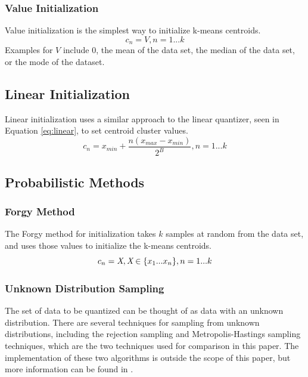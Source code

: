 \documentclass[journal]{IEEEtran}
\begin{document}
\subsubsection{Value Initialization}
Value initialization is the simplest way to initialize k-means centroids.
\begin{equation}
    c_n = V, n = 1...k
\end{equation}
Examples for $V$ include $0$, the mean of the data set, the median of the data set, or the mode of the dataset.

\subsection{Linear Initialization}
Linear initialization uses a similar approach to the linear quantizer, seen in Equation \ref{eq:linear}, to set centroid cluster values.
\begin{equation}
    c_n = x_{min} + \frac{n(x_{max} - x_{min})}{2^B}, n = 1...k 
\end{equation}

\subsection{Probabilistic Methods}
\subsubsection{Forgy Method}
The Forgy method for initialization takes $k$ samples at random from the data set, and uses those values to initialize the k-means centroids.
\begin{equation}
    c_n = \emph{X}, \emph{X} \in \{x_1...x_n\}, n = 1...k
\end{equation}

\subsubsection{Unknown Distribution Sampling}
The set of data to be quantized can be thought of as data with an unknown distribution. There are several techniques for sampling from unknown
distributions, including the rejection sampling and Metropolis-Hastings sampling techniques, which are the two techniques used for comparison in this
paper. The implementation of these two algorithms is outside the scope of this paper, but more information can be found in \cite{BayesianBook}.
\end{document}
